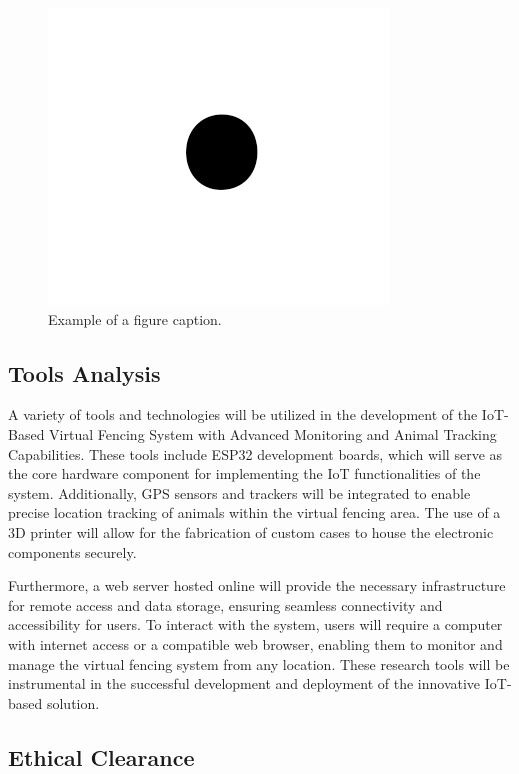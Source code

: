 \documentclass[conference]{main}
\begin{document}
\begin{figure}[htbp]
\centerline{\includegraphics{fig1.png}}
\caption{Example of a figure caption.}
\label{fig}
\end{figure}


\subsection{Tools Analysis}

A variety of tools and technologies will be utilized in the
development of the IoT-Based Virtual Fencing System with Advanced Monitoring and
Animal Tracking Capabilities. These tools include ESP32 development boards,
which will serve as the core hardware component for implementing the IoT
functionalities of the system. Additionally, GPS sensors and trackers will be
integrated to enable precise location tracking of animals within the virtual
fencing area. The use of a 3D printer will allow for the fabrication of custom
cases to house the electronic components securely.

Furthermore, a web server hosted online will provide the necessary
infrastructure for remote access and data storage, ensuring seamless
connectivity and accessibility for users. To interact with the system, users
will require a computer with internet access or a compatible web browser,
enabling them to monitor and manage the virtual fencing system from any
location. These research tools will be instrumental in the successful
development and deployment of the innovative IoT-based solution.

\subsection{Ethical Clearance}
\end{document}
